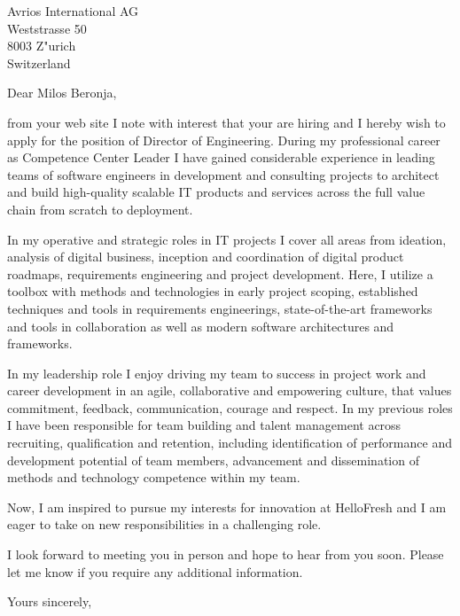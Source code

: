 \documentclass[10pt,a4paper]{dinbrief}
\date{\today}
\begin{document}
 
\begin{letter}  
{%
	Avrios International AG\\
	Weststrasse 50\\
	8003 Z"urich\\
	Switzerland\\
}
\subject{\bf Job Application VP of Engineering}
\opening{Dear Milos Beronja,}

from your web site I note with interest that your are  hiring and I hereby wish to apply for the position of Director of Engineering. During my professional career as Competence Center Leader I have gained considerable experience in leading teams of software engineers in development and consulting projects to architect and build high-quality scalable IT products and services across the full value chain from scratch to deployment.

In my operative and strategic roles in IT projects I cover all areas from ideation, analysis of digital business, inception and coordination of digital product roadmaps, requirements engineering and project development. Here, I utilize a toolbox with methods and technologies in early project scoping, established techniques and tools in requirements engineerings, state-of-the-art frameworks and tools in collaboration as well as modern software architectures and frameworks.

In my leadership role I enjoy driving my team to success in project work and career development in an agile, collaborative and empowering culture, that values commitment, feedback, communication, courage and respect. In my previous roles I have been responsible for team building and talent management across recruiting, qualification and retention, including identification of performance and development potential of team members, advancement and dissemination of methods and technology competence within my team.

Now, I am inspired to pursue my interests for innovation at HelloFresh and I am eager to take on new responsibilities in a challenging role.

I look forward to meeting you in person and hope to hear from you soon. Please let me know if you require any additional information.

\closing{Yours sincerely,}
\end{letter}
\end{document}
